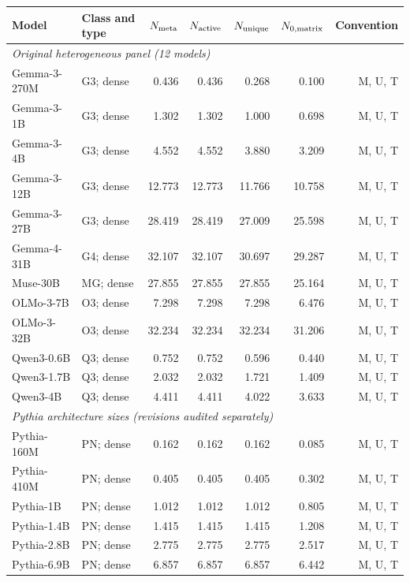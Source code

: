 \begin{table}[!htbp]\normalfont
\centering
\small
\setlength{\tabcolsep}{3pt}
\begin{tabular*}{\textwidth}{@{\extracolsep{\fill}}llrrrrr@{}}
\toprule
Model & Class and type & $N_{\rm meta}$ & $N_{\rm active}$ & $N_{\rm unique}$ & $N_{0,\rm matrix}$ & Convention \\
\midrule
\multicolumn{7}{l}{\textit{Original heterogeneous panel (12 models)}} \\
Gemma-3-270M & G3; dense & 0.436 & 0.436 & 0.268 & 0.100 & M, U, T \\
Gemma-3-1B & G3; dense & 1.302 & 1.302 & 1.000 & 0.698 & M, U, T \\
Gemma-3-4B & G3; dense & 4.552 & 4.552 & 3.880 & 3.209 & M, U, T \\
Gemma-3-12B & G3; dense & 12.773 & 12.773 & 11.766 & 10.758 & M, U, T \\
Gemma-3-27B & G3; dense & 28.419 & 28.419 & 27.009 & 25.598 & M, U, T \\
Gemma-4-31B & G4; dense & 32.107 & 32.107 & 30.697 & 29.287 & M, U, T \\
Muse-30B & MG; dense & 27.855 & 27.855 & 27.855 & 25.164 & M, U, T \\
OLMo-3-7B & O3; dense & 7.298 & 7.298 & 7.298 & 6.476 & M, U, T \\
OLMo-3-32B & O3; dense & 32.234 & 32.234 & 32.234 & 31.206 & M, U, T \\
Qwen3-0.6B & Q3; dense & 0.752 & 0.752 & 0.596 & 0.440 & M, U, T \\
Qwen3-1.7B & Q3; dense & 2.032 & 2.032 & 1.721 & 1.409 & M, U, T \\
Qwen3-4B & Q3; dense & 4.411 & 4.411 & 4.022 & 3.633 & M, U, T \\
\midrule
\multicolumn{7}{l}{\textit{Pythia architecture sizes (revisions audited separately)}} \\
Pythia-160M & PN; dense & 0.162 & 0.162 & 0.162 & 0.085 & M, U, T \\
Pythia-410M & PN; dense & 0.405 & 0.405 & 0.405 & 0.302 & M, U, T \\
Pythia-1B & PN; dense & 1.012 & 1.012 & 1.012 & 0.805 & M, U, T \\
Pythia-1.4B & PN; dense & 1.415 & 1.415 & 1.415 & 1.208 & M, U, T \\
Pythia-2.8B & PN; dense & 2.775 & 2.775 & 2.775 & 2.517 & M, U, T \\
Pythia-6.9B & PN; dense & 6.857 & 6.857 & 6.857 & 6.442 & M, U, T \\

\end{tabular*}
\end{table}
